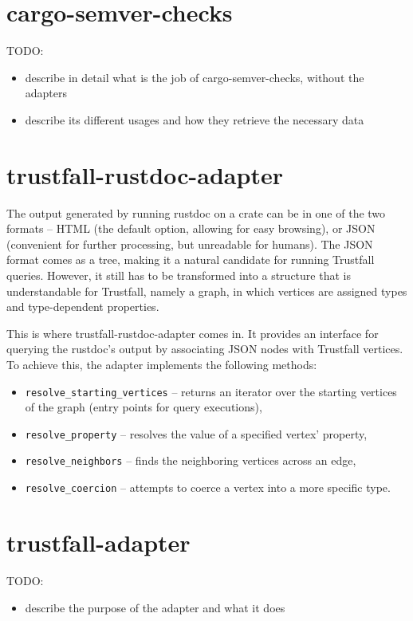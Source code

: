 \documentclass[licencjacka,en]{pracamgr}
\begin{document}
\section{cargo-semver-checks}

TODO:
\begin{itemize}
	\item describe in detail what is the job of cargo-semver-checks, without the adapters
	\item describe its different usages and how they retrieve the necessary data
\end{itemize}

\section{trustfall-rustdoc-adapter}
The output generated by running rustdoc on a crate can be in one of the two formats --
HTML (the default option, allowing for easy browsing), or JSON (convenient for further processing,
but unreadable for humans). The JSON format comes as a tree, making it a natural candidate for
running Trustfall queries. However, it still has to be transformed into a structure that is
understandable for Trustfall, namely a graph, in which vertices are assigned types and
type-dependent properties.

This is where trustfall-rustdoc-adapter comes in. It provides an interface for querying the rustdoc's
output by associating JSON nodes with Trustfall vertices. To achieve this, the adapter implements
the following methods:
\begin{itemize}
	\item \texttt{resolve\_starting\_vertices} -- returns an iterator over the starting vertices of
		the graph (entry points for query executions),
	\item \texttt{resolve\_property} -- resolves the value of a specified vertex' property,
	\item \texttt{resolve\_neighbors} -- finds the neighboring vertices across an edge,
	\item \texttt{resolve\_coercion} -- attempts to coerce a vertex into a more specific type.
\end{itemize}

\section{trustfall-adapter}

TODO:
\begin{itemize}
	\item describe the purpose of the adapter and what it does
\end{itemize}
\end{document}
